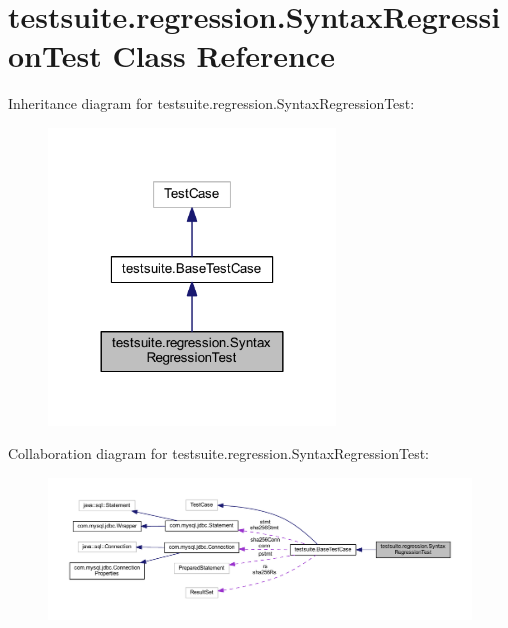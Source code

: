 \hypertarget{classtestsuite_1_1regression_1_1_syntax_regression_test}{}\section{testsuite.\+regression.\+Syntax\+Regression\+Test Class Reference}
\label{classtestsuite_1_1regression_1_1_syntax_regression_test}


Inheritance diagram for testsuite.\+regression.\+Syntax\+Regression\+Test\+:
\nopagebreak
\begin{figure}[H]
\begin{center}
\leavevmode
\includegraphics[width=216pt]{classtestsuite_1_1regression_1_1_syntax_regression_test__inherit__graph}
\end{center}
\end{figure}


Collaboration diagram for testsuite.\+regression.\+Syntax\+Regression\+Test\+:
\nopagebreak
\begin{figure}[H]
\begin{center}
\leavevmode
\includegraphics[width=350pt]{classtestsuite_1_1regression_1_1_syntax_regression_test__coll__graph}
\end{center}
\end{figure}

